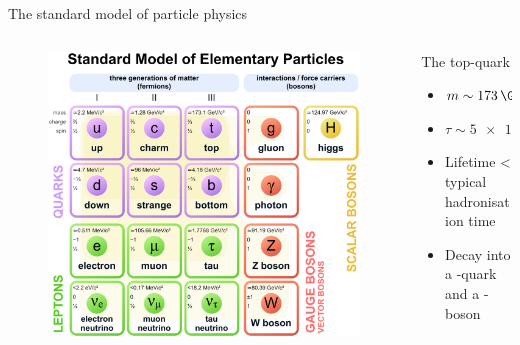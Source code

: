 \begin{frame}{The standard model of particle physics}
\begin{columns}
\begin{column}{0.6\textwidth}
\begin{figure}
    \centering
    \includegraphics[scale=0.17]{Standard_Model_of_Elementary_Particles.eps}
\end{figure}
\end{column}
\pause
\begin{column}{0.4\textwidth}
\begin{block}{The top-quark}
        \begin{itemize}
            \item $ m \sim \SI{173}{\GeVovercsq}$
            \vspace{0.2cm}
            \item $\tau \sim \SI{5e-25}{\second}$
            \vspace{0.2cm}
            \item Lifetime < typical hadronisation time 
            \vspace{0.2cm}
            \item Decay into a \Pbottom-quark and a \PW-boson
        \end{itemize}
\end{block}
\end{column}
\end{columns}

\end{frame}

